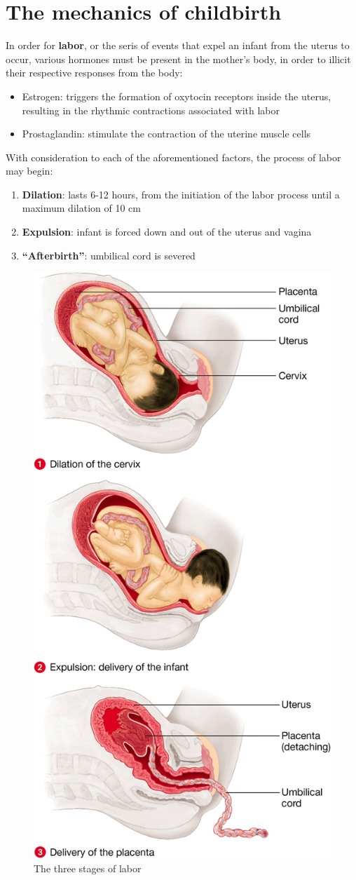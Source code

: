 \documentclass{article}
\begin{document}
\section{The mechanics of childbirth}

In order for \textbf{labor}, or the seris of events that expel an infant from
the uterus to occur, various hormones must be present in the mother's body,
in order to illicit their respective responses from the body:

\begin{itemize}
	\item Estrogen: triggers the formation of oxytocin receptors inside the uterus,
		resulting in the rhythmic contractions associated with labor 
	\item Prostaglandin: stimulate the contraction of the uterine muscle cells
\end{itemize}

With consideration to each of the aforementioned factors, the process of labor may
begin:

\begin{enumerate}
	\item \textbf{Dilation}: lasts 6-12 hours, from the initiation of the labor
		process until a maximum dilation of 10 cm
	\item \textbf{Expulsion}: infant is forced down and out of the uterus and vagina
	\item \textbf{``Afterbirth''}: umbilical cord is severed
\end{enumerate}

\begin{figure}[h]
	\centering
	\includegraphics[width=.45\linewidth]{infant_delivery.png}
	\caption{The three stages of labor}
\end{figure}
\end{document}
